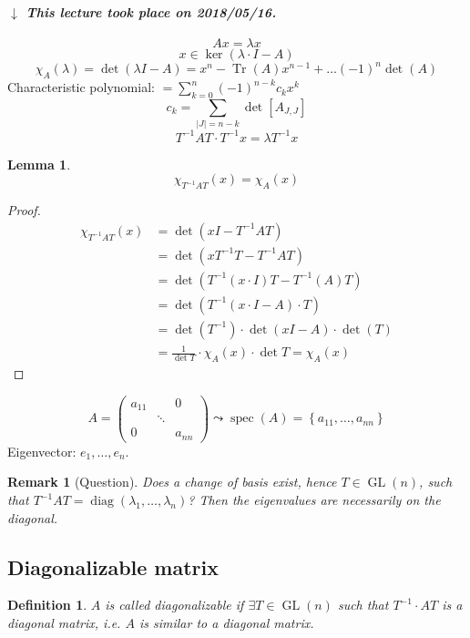 \documentclass{article}
\newcounter{lecref}[section]
\numberwithin{lecref}{section}
\newtheorem{definition}[lecref]{Definition}
\newtheorem{lemma}[lecref]{Lemma}
\newtheorem{remark}[lecref]{Remark}
\newcommand{\set}[1]{\left\{#1\right\}}
\newcommand{\card}[1]{\left|#1\right|}
\newcommand{\dateref}[1]{%
  \begin{mdframed}[backgroundcolor=gray!10,innerbottommargin=0pt,innertopmargin=0pt]
    \paragraph{\textit{$\downarrow$ This lecture took place on #1.}}%
  \end{mdframed}%
}
\begin{document}
\dateref{2018/05/16}

\[ Ax = \lambda x \]
\[ x \in \ker(\lambda \cdot I - A) \]
\[ \chi_A(\lambda) = \det(\lambda I - A) = x^n - \operatorname{Tr}(A) x^{n-1} + \dots (-1)^n \det(A) \]
Characteristic polynomial: $= \sum_{k=0}^n (-1)^{n-k} c_k x^k$
\[ c_k = \sum_{\card{J} = n-k} \det[A_{J,J}] \]
\[ T^{-1} AT \cdot T^{-1} x = \lambda T^{-1} x \]

\begin{lemma} %
  \[ \chi_{T^{-1} AT}(x) = \chi_A(x) \]
\end{lemma}
\begin{proof}
  \begin{align*}
    \chi_{T^{-1}AT}(x) &= \det(xI - T^{-1}AT) \\
      &= \det(x T^{-1} T - T^{-1} AT) \\
      &= \det(T^{-1} (x \cdot I) T - T^{-1} (A) T) \\
      &= \det(T^{-1}(x \cdot I - A) \cdot T) \\
      &= \det(T^{-1}) \cdot \det(xI - A) \cdot \det(T) \\
      &= \frac{1}{\det{T}} \cdot \chi_A(x) \cdot \det{T} = \chi_A(x)
  \end{align*}
\end{proof}

\[ A = \begin{pmatrix} a_{11} & & 0 \\ & \ddots & \\ 0 & & a_{nn} \end{pmatrix} \leadsto \operatorname{spec}(A) = \set{a_{11}, \dots, a_{nn}} \]
Eigenvector: $e_1, \dots, e_n$.

\begin{remark}[Question]
  Does a change of basis exist, hence $T \in \operatorname{GL}(n)$, such that $T^{-1} AT = \operatorname{diag}(\lambda_1, \dots, \lambda_n)$?
  Then the eigenvalues are necessarily on the diagonal.
\end{remark}

\subsection{Diagonalizable matrix}

\begin{definition} %
  $A$ is called \emph{diagonalizable} if $\exists T \in \operatorname{GL}(n)$ such that $T^{-1} \cdot AT$ is a diagonal matrix,
  i.e. $A$ is \emph{similar} to a diagonal matrix.
\end{definition}
\end{document}

